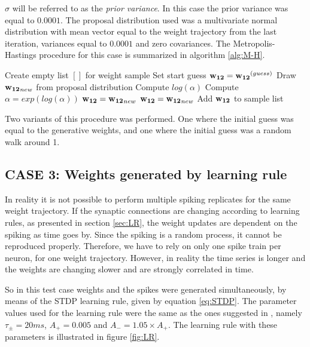 $\sigma$ will be referred to as the \textit{prior variance}. In this case the  prior variance was equal to $0.0001$. The proposal distribution used was a multivariate normal distribution with mean vector equal to the weight trajectory from the last iteration, variances equal to $0.0001$ and zero covariances. 
The Metropolis-Hastings procedure for this case is summarized in algorithm \ref{alg:M-H}.

\begin{algorithm}
\caption{}\label{alg:M-H}
\begin{algorithmic}
\State Create empty list $[]$ for weight sample
\State Set start guess ${\bf w_{12}} = {\bf w_{12}}^{(guess)}$
\State Draw ${\bf w_{12}}_{new}$ from proposal distribution
\State Compute $log(\alpha)$
\State Compute $\alpha = exp(log(\alpha))$
\State ${\bf w_{12}} = {\bf w_{12}}_{new}$
\Else 
{}
\State ${\bf w_{12}} = {\bf w_{12}}_{new}$
\EndIf
\EndIf
\State Add ${\bf w_{12}}$ to sample list
\EndFor
\end{algorithmic}
\end{algorithm}

Two variants of this procedure was performed. One where the initial guess was equal to the generative weights, and one where the initial guess was a random walk around 1. 

\subsection{CASE 3: Weights generated by learning rule}
In reality it is not possible to perform multiple spiking replicates for the same weight trajectory. If the synaptic connections are changing according to learning rules, as presented in section \ref{sec:LR}, the weight updates are dependent on the spiking as time goes by. Since the spiking is a random process, it cannot be reproduced properly. Therefore, we have to rely on only one spike train per neuron, for one weight trajectory. However, in reality the time series is longer and the weights are changing slower and are strongly correlated in time. 

So in this test case weights and the spikes were generated simultaneously, by means of the STDP learning rule, given by equation \ref{eq:STDP}. The parameter values used for the learning rule were the same as the ones suggested in \cite{Song}, namely $\tau_{\pm} = 20 ms$, $A_+ = 0.005$ and $A_- = 1.05 \times A_+$. The learning rule with these parameters is illustrated in figure \ref{fig:LR}.


